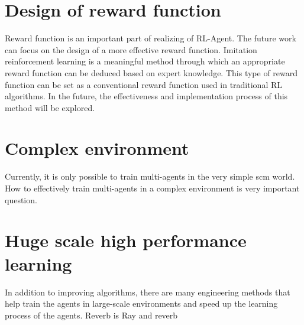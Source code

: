 \section{Design of reward function}
Reward function is an important part of realizing of RL-Agent. The future work can focus on the design of a more effective reward function. Imitation reinforcement learning is a meaningful method through which an appropriate reward function can be deduced based on expert knowledge. This type of reward function can be set as a conventional reward function used in traditional RL algorithms. In the future, the effectiveness and implementation process of this method will be explored.

\section{Complex environment}
Currently, it is only possible to train multi-agents in the very simple \gls{scm} world. How to effectively train multi-agents in a complex environment is very important question. 

\section{Huge scale high performance learning}
In addition to improving algorithms, there are many engineering methods that help train the agents in large-scale environments and speed up the learning process of the agents. Reverb is 
Ray and reverb
